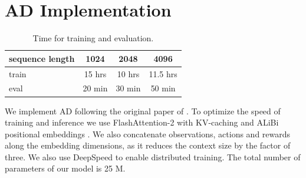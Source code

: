 \documentclass{article}
\begin{document}




\section{AD Implementation}
\label{apndx:ad}

\begin{table}[h!]
\caption{Time for training and evaluation.}
\centering
\label{tab:ad-time}
\begin{tabular}{@{}lccc@{}}
\toprule
sequence length & 1024 & 2048 & 4096 \\ \midrule
train & 15 hrs & 10 hrs & 11.5 hrs \\
eval & 20 min & 30 min & 50 min \\ \bottomrule
\end{tabular}
\end{table}

We implement AD following the original paper of \citet{laskin2022context}. To optimize the speed of training and inference we use FlashAttention-2 \citep{dao2023flashattention2} with KV-caching and ALiBi positional embeddings \citep{press2022train}. We also concatenate observations, actions and rewards along the embedding dimensions, as it reduces the context size by the factor of three. We also use DeepSpeed \citep{rasley2020deepspeed} to enable distributed training. The total number of parameters of our model is 25 M.
\end{document}

